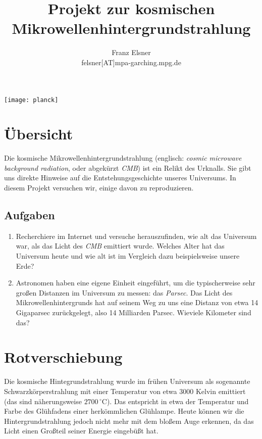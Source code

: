 \documentclass[12pt,twoside,a4paper]{article}
\newcommand{\cmb}{\emph{CMB}\xspace}
\begin{document}
\title{Projekt zur kosmischen Mikrowellenhintergrundstrahlung}

\author{Franz Elsner\\felsner[AT]mpa-garching.mpg.de}

\maketitle

\begin{center}
  \texttt{[image: planck]}
\end{center}



\section{\"Ubersicht}

Die kosmische Mikrowellenhintergrundstrahlung (englisch: \emph{cosmic
  microwave background radiation}, oder abgek\"urzt \cmb) ist ein
Relikt des Urknalls. Sie gibt uns direkte Hinweise auf die
Entstehungsgeschichte unseres Universums. In diesem Projekt versuchen
wir, einige davon zu reproduzieren.


\subsection{Aufgaben}

\begin{enumerate}
\item Recherchiere im Internet und versuche herauszufinden, wie alt
  das Universum war, als das Licht des \cmb emittiert wurde. Welches
  Alter hat das Universum heute und wie alt ist im Vergleich dazu
  beispielsweise unsere Erde?
 \item Astronomen haben eine eigene Einheit eingef\"uhrt, um die
   typischerweise sehr gro{\ss}en Distanzen im Universum zu messen: das
   \emph{Parsec}. Das Licht des Mikrowellenhintergrunds hat auf seinem
   Weg zu uns eine Distanz von etwa 14 Gigaparsec zur\"uckgelegt, also
   14 Milliarden Parsec. Wieviele Kilometer sind das?
\end{enumerate}



\section{Rotverschiebung}

Die kosmische Hintegrundstrahlung wurde im fr\"uhen Universum als
sogenannte Schwarz\-k\"orperstrahlung mit einer Temperatur von etwa
3000 Kelvin emittiert (das sind n\"aherungsweise $2700 \,
^{\circ}\mathrm{C}$). Das entspricht in etwa der Temperatur und Farbe
des Gl\"uhfadens einer herk\"omm\-lichen Gl\"uhlampe. Heute k\"onnen
wir die Hintergrundstrahlung jedoch nicht mehr mit dem blo{\ss}em Auge
erkennen, da das Licht einen Gro{\ss}teil seiner Energie
eingeb\"u{\ss}t hat.
\end{document}
